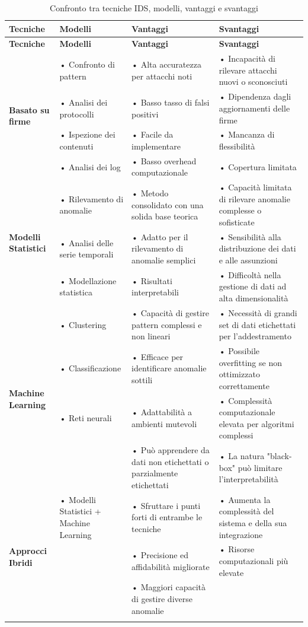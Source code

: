 \begin{longtable}{|p{3cm}|p{3cm}|p{4cm}|p{4cm}|}
\hline
\textbf{Tecniche} & \textbf{Modelli} & \textbf{Vantaggi} & \textbf{Svantaggi} \\
\hline
\endfirsthead %
\hline
\textbf{Tecniche} & \textbf{Modelli} & \textbf{Vantaggi} & \textbf{Svantaggi} \\
\hline
\endhead %

\multirow{4}{3cm}{\raggedright \textbf{Basato su firme}} 
 & • Confronto di pattern & • Alta accuratezza per attacchi noti & • Incapacità di rilevare attacchi nuovi o sconosciuti \\
 & • Analisi dei protocolli & • Basso tasso di falsi positivi & • Dipendenza dagli aggiornamenti delle firme \\
 & • Ispezione dei contenuti & • Facile da implementare & • Mancanza di flessibilità \\
 & • Analisi dei log & • Basso overhead computazionale & • Copertura limitata \\
\hline
\multirow{3}{3cm}{\raggedright \textbf{Modelli Statistici}} 
 & • Rilevamento di anomalie & • Metodo consolidato con una solida base teorica & • Capacità limitata di rilevare anomalie complesse o sofisticate \\
 & • Analisi delle serie temporali & • Adatto per il rilevamento di anomalie semplici & • Sensibilità alla distribuzione dei dati e alle assunzioni \\
 & • Modellazione statistica & • Risultati interpretabili & • Difficoltà nella gestione di dati ad alta dimensionalità \\
\hline
\multirow{4}{3cm}{\raggedright \textbf{Machine Learning}} 
 & • Clustering & • Capacità di gestire pattern complessi e non lineari & • Necessità di grandi set di dati etichettati per l'addestramento \\
 & • Classificazione & • Efficace per identificare anomalie sottili & • Possibile overfitting se non ottimizzato correttamente \\
 & • Reti neurali & • Adattabilità a ambienti mutevoli & • Complessità computazionale elevata per algoritmi complessi \\
 &  & • Può apprendere da dati non etichettati o parzialmente etichettati & • La natura "black-box" può limitare l'interpretabilità \\
\hline
\multirow{4}{3cm}{\raggedright \textbf{Approcci Ibridi}} 
 & • Modelli Statistici + Machine Learning & • Sfruttare i punti forti di entrambe le tecniche & • Aumenta la complessità del sistema e della sua integrazione \\
 &  & • Precisione ed affidabilità migliorate & • Risorse computazionali più elevate \\
 &  & • Maggiori capacità di gestire diverse anomalie &  \\
\hline
\caption{Confronto tra tecniche IDS, modelli, vantaggi e svantaggi}
\label{tab:confronto_ids}
\end{longtable}

